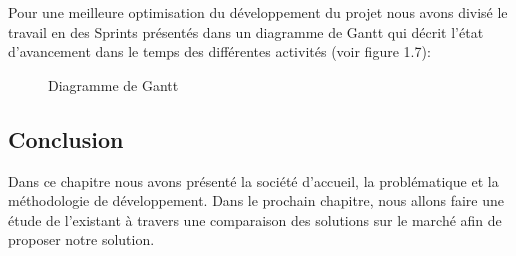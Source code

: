 Pour une meilleure optimisation  du développement du projet nous avons divisé le travail en des Sprints présentés dans un diagramme de Gantt qui décrit l’état d’avancement dans le temps des différentes activités (voir figure 1.7):

\begin{figure}[H]
    \begin{center}
    \end{center}
    \caption{Diagramme de Gantt}
\end{figure}

\subsection{\selectfont\Large    Conclusion}

 Dans ce chapitre nous avons présenté la société d’accueil, la problématique et la méthodologie de développement.
    Dans le prochain chapitre, nous allons faire une étude de l’existant à travers une comparaison des solutions sur le marché afin de proposer notre solution.